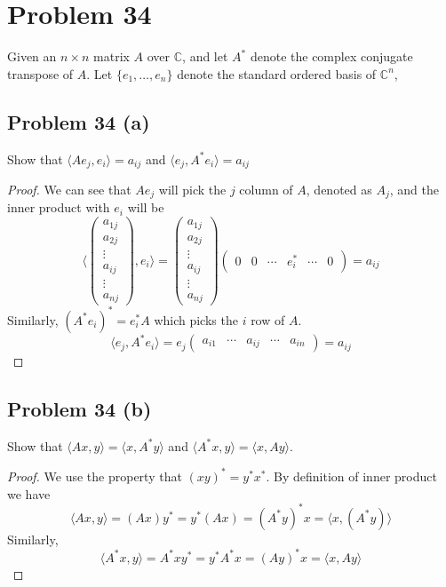 \documentclass{article}[10pt]
\def\CC{\mathbb C}
\begin{document}
\section{Problem 34}
Given an $n \times n$ matrix $A$ over $\CC$, and let $A^*$ denote the
complex conjugate transpose of $A$. Let $\{e_1,\ldots,e_n\}$ denote
the standard ordered basis of $\CC^n$, 
\subsection{Problem 34 (a)}
Show that $\langle Ae_j,e_i \rangle = a_{ij}$ and $\langle e_j,A^*e_i \rangle = a_{ij}$
\begin{proof}
We can see that $Ae_j$ will pick the $j$ column of $A$, denoted as $A_j$, and
the inner product with $e_i$ will be
\[
\langle \begin{pmatrix} a_{1j} \\ a_{2j} \\ \vdots \\ a_{ij} \\ \vdots \\ a_{nj} \end{pmatrix}, e_i \rangle = \begin{pmatrix} a_{1j} \\ a_{2j} \\ \vdots \\ a_{ij} \\ \vdots \\ a_{nj} \end{pmatrix} 
\begin{pmatrix} 0 & 0 & \cdots & e_i^* & \cdots & 0 \end{pmatrix} = 
a_{ij}
\]
Similarly, $(A^*e_i)^*=e_i^*A$ which picks the $i$ row of $A$.
\[
\langle e_j,A^*e_i \rangle = e_j 
  \begin{pmatrix} a_{i1} & \cdots & a_{ij} & \cdots & a_{in} \end{pmatrix} = a_{ij}
\]
\end{proof}
\subsection{Problem 34 (b)}
Show that $\langle Ax,y \rangle = \langle x,A^*y\rangle$ and 
$\langle A^*x,y \rangle = \langle x,Ay\rangle$. 
\begin{proof}
We use the property that $(xy)^*=y^*x^*$.
By definition of
inner product we have
\[
\langle Ax,y \rangle = (Ax)y^* = y^*(Ax) = (A^*y)^*x = \langle x,(A^*y) \rangle
\]
Similarly, 
\[
\langle A^*x,y \rangle = A^*xy^* = y^*A^*x = (Ay)^*x = \langle x,Ay \rangle
\]
\end{proof}
\end{document}
